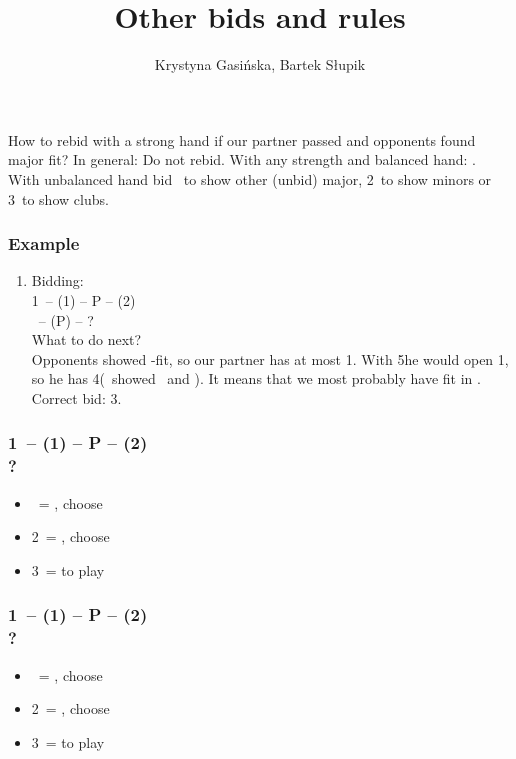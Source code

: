 \documentclass[12pt, a4paper]{article}
\title{Other bids and rules}
\author{Krystyna Gasińska, Bartek Słupik}
\begin{document}
\maketitle

How to rebid with a strong hand if our partner passed and 
opponents found major fit? In general: Do not rebid.
With any strength and balanced hand: \pass. With unbalanced hand
bid \dbl\ to show other (unbid) major, 2\nt\ to show 
minors or 3\clubs\ to show clubs.

\subsubsection*{Example}
\begin{enumerate}
    \item {
        Bidding:\\
        1\clubs\ -- (1\spades) -- P -- (2\spades)\\
        \dbl\ -- (P) -- ?\\
        What to do next?\\
        Opponents showed \spades-fit, so our partner has at most 1\spades.
        With 5\hearts he would open 1\hearts, so he has 4\hearts (\dbl\ showed
        \clubs\ and \hearts). It means that we most probably have fit in \diams.\\
        Correct bid: 3\diams.
    }
\end{enumerate}



\subsubsection*{1\clubs\ -- (1\hearts) -- P -- (2\hearts) \\ ?}
\begin{itemize}
    \item \dbl\ = \clubs\spades, choose
    \item 2\nt\ = \clubs\diams, choose
    \item 3\clubs\ = to play
\end{itemize}

\subsubsection*{1\clubs\ -- (1\spades) -- P -- (2\spades) \\ ?}
\begin{itemize}
    \item \dbl\ = \clubs\hearts, choose
    \item 2\nt\ = \clubs\diams, choose
    \item 3\clubs\ = to play
\end{itemize}
\end{document}
